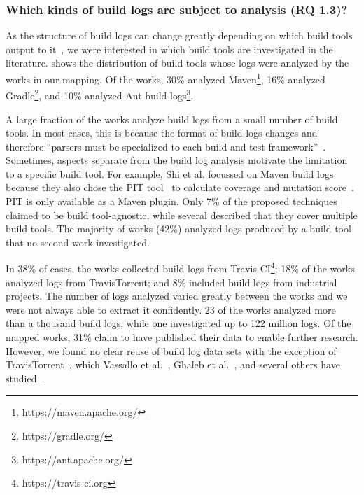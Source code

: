 \subsubsection{Which kinds of build logs are subject to
  analysis (RQ 1.3)?}
As the structure of build logs can change greatly depending on which
build tools output to it~\citep{staahl2014modeling},
we were interested in which build tools are
investigated in the literature.
 shows the distribution of
build tools whose logs were analyzed by the works in our mapping.
Of the works, 30\% analyzed
Maven\footnote{https://maven.apache.org/},
16\% analyzed Gradle\footnote{https://gradle.org/},
and 10\% analyzed Ant build logs\footnote{https://ant.apache.org/}.

A large fraction of the works analyze build logs
from a small number of build tools.
In most cases, this is because the format of build logs
changes and
therefore ``parsers must be specialized to each build and test
framework''~\citep{tomassi2019bugswarm}.
Sometimes, aspects separate from the build log analysis motivate
the limitation to a specific build tool.
For example, Shi et al.
focussed on Maven
build logs because they also chose the PIT tool~\citep{coles2016pit}
to calculate coverage
and mutation score~\citep{shi2018evaluating}.
PIT is only available as a Maven plugin.
Only 7\% of the proposed techniques claimed to be
build tool-agnostic, while
several described that they cover multiple build tools.
The majority of works (42\%) analyzed logs produced by a build tool
that no second work investigated.

In 38\% of cases, the works collected build logs from Travis
CI\footnote{https://travis-ci.org};
18\% of the works analyzed logs from TravisTorrent; and 8\% included
build logs from industrial projects.
The number of logs analyzed varied greatly between the works
and we were not always able to
extract it confidently.
23 of the works analyzed more than a thousand build logs, while one
investigated up to 122 million logs.
Of the mapped works, 31\% claim to have published their data to
enable further research.
However, we found no clear reuse of build log data sets with the
exception of TravisTorrent~\citep{beller2017travistorrent}, which
Vassallo et al.~\citep{vassallo2017a-tale},
Ghaleb et al.~\citep{ghaleb2019studying},
and several others have studied~\citep{hassan2017change,
hassan2019tackling,hassan2017automatic,orellana2017differences,
haghighatkhah2018test,madeyski2017continuous,ghaleb2019empirical,
santolucito2018statically,gallaba2018noise,shi2018evaluating}.

